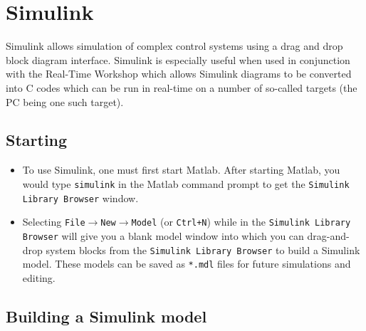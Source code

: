 \chapter{Simulink}\label{chap:simulink}

\textsf{Simulink} allows simulation of complex control systems using a drag
and drop block diagram interface.  \textsf{Simulink} is especially useful
when used in conjunction with the Real-Time Workshop which allows
\textsf{Simulink} diagrams to be converted into C codes which can be run in
real-time on a number of so-called targets (the PC being one such target).

\section{Starting}

\begin{itemize}
    \item To use \textsf{Simulink}, one must first start \textsf{Matlab}.  After
          starting \textsf{Matlab}, you would type \verb|simulink| in the
          \textsf{Matlab} command prompt to get the \verb|Simulink Library Browser|
          window.

    \item Selecting \verb|File|\(\to \)\verb|New|\(\to \)\verb|Model| (or
          \verb|Ctrl+N|) while in the \verb|Simulink Library Browser| will give you a
          blank model window into which you can drag-and-drop system blocks from the
          \verb|Simulink Library Browser| to build a \textsf{Simulink} model.  These
          models can be saved as \verb|*.mdl| files for future simulations and editing.
\end{itemize}

\section{Building a \textsf{Simulink} model}

